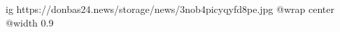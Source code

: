  
 
 
 
 

\ifcmt
  ig https://donbas24.news/storage/news/3nob4picyqyfd8pe.jpg
  @wrap center
  @width 0.9
\fi
